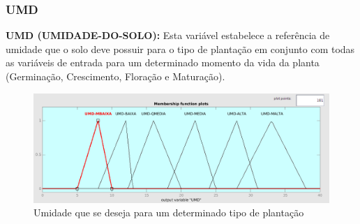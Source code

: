 \subsubsection{UMD}

\textbf{UMD (UMIDADE-DO-SOLO):} Esta variável estabelece a referência de umidade que o solo deve possuir para o tipo de plantação em conjunto com todas as variáveis de entrada para um determinado momento da vida da planta (Germinação, Crescimento, Floração e Maturação).

\begin{figure}[h!]
\centering
\includegraphics[width=1\linewidth]{Descricao/Imagens/UMD}
\caption{Umidade que se deseja para um determinado tipo de plantação}
\label{fig:UMD}
\end{figure}
